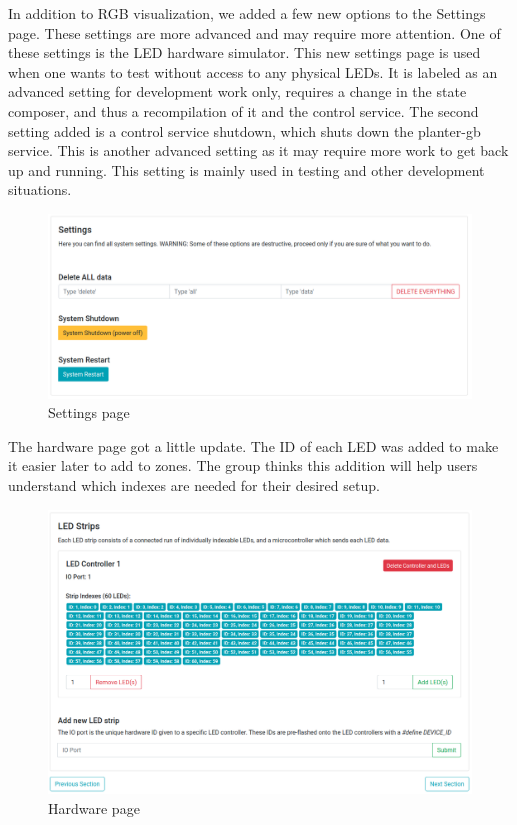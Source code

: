 \documentclass[onecolumn, draftclsnofoot,10pt, compsoc]{IEEEtran}
\begin{document}
		\noindent In addition to RGB visualization, we added a few new options to the Settings page. These settings are more advanced and may require more 
		attention. One of these settings is the LED hardware simulator. This new settings page is used when one wants to test without access to any physical 
		LEDs. It is labeled as an advanced setting for development work only, requires a change in the state composer, and thus a recompilation of it and the
		control service. The second setting added is a control service shutdown, which shuts down the planter-gb service. This is another advanced setting as 
		it may require more work to get back up and running. This setting is mainly used in testing and other development situations.

		\begin{center}
			\begin{figure}[H]
				\includegraphics[width=\linewidth]{site/settings.png}
				\caption{Settings page}
				\label{fig:siteSettings}
			\end{figure}
		\end{center}
		\noindent The hardware page got a little update. The ID of each LED was added to make it easier later to add to zones. The group thinks this addition
		will help users understand which indexes are needed for their desired setup.
		\begin{center}
			\begin{figure}[H]
				\includegraphics[width=\linewidth]{site/hardware.png}
				\caption{Hardware page}
				\label{fig:siteHardware}
			\end{figure}
		\end{center}
\end{document}
